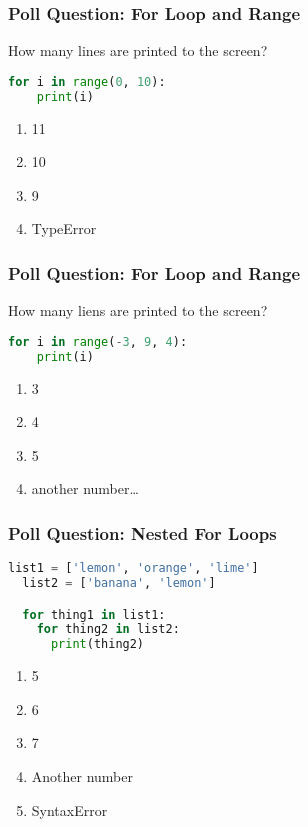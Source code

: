 \documentclass{beamer}
\begin{document}
%
%
\begin{frame}[fragile]
  \frametitle{Poll Question: For Loop and Range}
  How many lines are printed to the screen?
  \begin{lstlisting}[language=Python, autogobble]
  for i in range(0, 10):
    print(i)
  \end{lstlisting}
  \vfill
  \begin{enumerate}[A]
    \item 11
    \item 10
    \item 9
    \item TypeError
  \end{enumerate}
\end{frame}

%
%
\begin{frame}[fragile]
  \frametitle{Poll Question: For Loop and Range}
  How many liens are printed to the screen?
  \begin{lstlisting}[language=Python, autogobble]
  for i in range(-3, 9, 4):
    print(i)
  \end{lstlisting}
  \vfill
  \begin{enumerate}[A]
    \item 3
    \item 4
    \item 5
    \item another number\dots
  \end{enumerate}
\end{frame}

%
%
\begin{frame}[fragile]
  \frametitle{Poll Question: Nested For Loops}

  \begin{lstlisting}[language=Python, autogobble]
  list1 = ['lemon', 'orange', 'lime']
  list2 = ['banana', 'lemon']

  for thing1 in list1:
    for thing2 in list2:
      print(thing2)
  \end{lstlisting}
  \vfill
  \begin{enumerate}[A]
    \item 5
    \item 6
    \item 7
    \item Another number
    \item SyntaxError
  \end{enumerate}
\end{frame}
\end{document}
